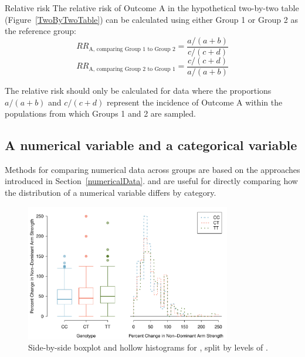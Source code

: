 \begin{onebox}{Relative risk}%
		The relative risk of Outcome A in the hypothetical two-by-two table (Figure~\ref{TwoByTwoTable}) can be calculated using either Group 1 or Group 2 as the reference group:
		\[RR_{\textrm{A, comparing Group 1 to Group 2}} = \dfrac{a/(a+b)}{c/(c+d)} \]
		\[RR_{\textrm{A, comparing Group 2 to Group 1}} = \dfrac{c/(c+d)}{a/(a+b)} \]
		
		The relative risk should only be calculated for data where the proportions $a/(a+b)$ and $c/(c+d)$ represent the incidence of Outcome A within the populations from which Groups 1 and 2 are sampled.
\end{onebox}

\subsection{A numerical variable and a categorical variable}
\label{comparingAcrossGroups}

Methods for comparing numerical data across groups are based on the approaches introduced in Section~\ref{numericalData}.  and  are useful for directly comparing how the distribution of a numerical variable differs by category. 


\begin{figure}[h]
	\centering
	\includegraphics[width=0.8\textwidth]{ch_intro_to_data_oi_biostat/figures/famussGenoMuscFunc/famussGenoMuscFunc}
	\caption{Side-by-side boxplot and hollow histograms for , split by levels of .}
	\label{famussGenoMuscFunc}
\end{figure}


